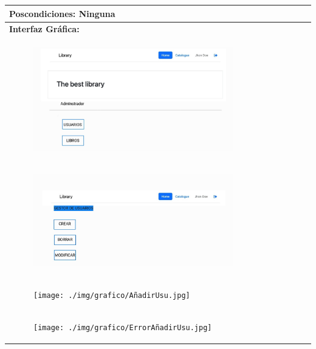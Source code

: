 \documentclass{report}
\begin{document}
\begin{center}
\begin{longtable}{|p{\linewidth}|}
                        \hline
                        \textbf{Poscondiciones:} Ninguna\\
                        \hline
                        \textbf{Interfaz Gráfica:}\\
                        \begin{figure}[H]
                            \centering
                            \includegraphics[width=0.8\textwidth]{./img/grafico/MenuAdmin.jpg}
                        \end{figure}\\
                        \hline
                        \begin{figure}[H]
                            \centering
                            \includegraphics[width=0.8\textwidth]{./img/grafico/MenuGestorUsu.jpg}
                        \end{figure}\\
                        \hline
                        \begin{figure}[H]
                            \centering
                            \texttt{[image: ./img/grafico/AñadirUsu.jpg]}
                        \end{figure}\\
                        \hline
                        \begin{figure}[H]
                            \centering
                            \texttt{[image: ./img/grafico/ErrorAñadirUsu.jpg]}
                        \end{figure}\\

\end{longtable}
\end{center}
\end{document}
